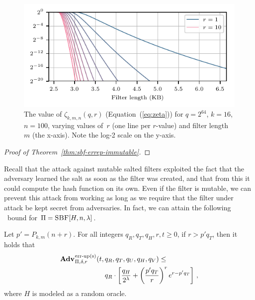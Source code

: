 \begin{figure}
  \hspace*{-10pt}
  \includegraphics{fig/bf-bound}
  \vspace{-24pt}
  \caption{
    The value of $\zeta_{k,m,n}(q,r)$ (Equation~(\ref{eq:zeta})) for $q=2^{64}$,
    $k=16$, $n=100$, varying values of~$r$ (one line per $r$-value) and filter
    length~$m$ (the x-axis).  Note the log-2 scale on the y-axis.
  }
  \label{fig:bf-bound}
\end{figure}

\begin{proof}[Proof of Theorem~\ref{thm:sbf-errep-immutable}]
  
\end{proof}


Recall that the attack against mutable salted filters exploited the fact that
the adversary learned the salt as soon as the filter was created, and that from
this it could compute the hash function on its own. Even if the filter is
mutable, we can prevent this attack from working as long as we require that the
filter under attack be kept secret from adversaries. In fact, we can attain the
following \erreps\ bound for $\Pi = \textnormal{\textsc{SBF}}[H,n,\lambda]$.

\begin{theorem}\label{thm:sbf-erreps}
  Let $p' = P_{k,m}(n+r)$.
  For all integers $q_R, q_T, q_H, r, t \geq 0$, if
  $r > p'q_T$, then it holds that
  \begin{eqnarray*}
    \begin{aligned}
      \Adv{\erreps}_{\Pi,\delta,r}(t,\,&q_R, q_T, q_U, q_H, q_V) \leq \\
          & q_R \cdot \left[
      \frac{q_H}{2^\lambda} +
      \left(\frac{p'q_T}{r}\right)^re^{r-p'q_T}\right]\,,
    \end{aligned}
\end{eqnarray*}
  where $H$ is modeled as a random oracle.
\end{theorem}

